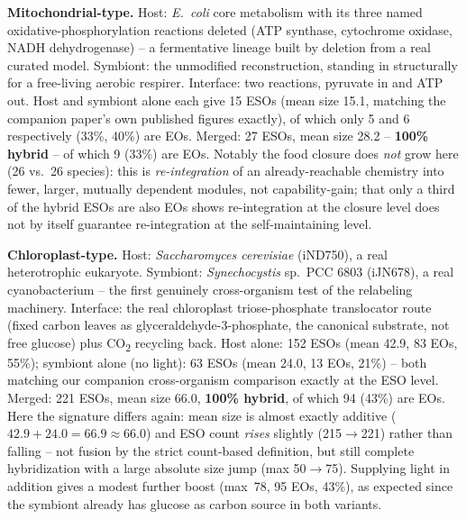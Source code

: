 \documentclass[9pt,twocolumn,twoside]{pnas-new}
\begin{document}
\textbf{Mitochondrial-type.} Host: \textit{E.\ coli} core metabolism with its three named oxidative-phosphorylation reactions deleted (ATP synthase, cytochrome oxidase, NADH dehydrogenase) -- a fermentative lineage built by deletion from a real curated model. Symbiont: the unmodified reconstruction, standing in structurally for a free-living aerobic respirer. Interface: two reactions, pyruvate in and ATP out. Host and symbiont alone each give 15 ESOs (mean size 15.1, matching the companion paper's own published figures exactly), of which only 5 and 6 respectively (33\%, 40\%) are EOs. Merged: 27 ESOs, mean size 28.2 -- \textbf{100\% hybrid} -- of which 9 (33\%) are EOs. Notably the food closure does \emph{not} grow here (26 vs.\ 26 species): this is \emph{re-integration} of an already-reachable chemistry into fewer, larger, mutually dependent modules, not capability-gain; that only a third of the hybrid ESOs are also EOs shows re-integration at the closure level does not by itself guarantee re-integration at the self-maintaining level.

\textbf{Chloroplast-type.} Host: \textit{Saccharomyces cerevisiae} (iND750), a real heterotrophic eukaryote. Symbiont: \textit{Synechocystis} sp.\ PCC 6803 (iJN678), a real cyanobacterium -- the first genuinely cross-organism test of the relabeling machinery. Interface: the real chloroplast triose-phosphate translocator route (fixed carbon leaves as glyceraldehyde-3-phosphate, the canonical substrate, not free glucose) plus CO\textsubscript{2} recycling back. Host alone: 152 ESOs (mean 42.9, 83 EOs, 55\%); symbiont alone (no light): 63 ESOs (mean 24.0, 13 EOs, 21\%) -- both matching our companion cross-organism comparison exactly at the ESO level. Merged: 221 ESOs, mean size 66.0, \textbf{100\% hybrid}, of which 94 (43\%) are EOs. Here the signature differs again: mean size is almost exactly additive ($42.9+24.0=66.9\approx66.0$) and ESO count \emph{rises} slightly (215$\to$221) rather than falling -- not fusion by the strict count-based definition, but still complete hybridization with a large absolute size jump (max 50$\to$75). Supplying light in addition gives a modest further boost (max~78, 95 EOs, 43\%), as expected since the symbiont already has glucose as carbon source in both variants.
\end{document}
